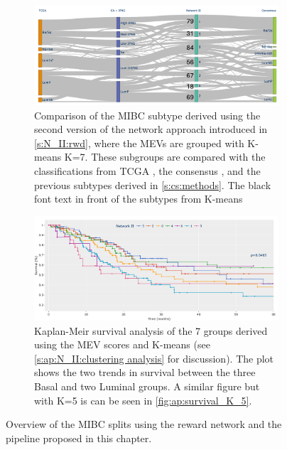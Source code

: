\begin{figure}[H]
    \centering
    \begin{subfigure}[!t]{1.0\textwidth}
        \includegraphics[width=1.0\textwidth,height=1.0\textheight,keepaspectratio]{Sections/Network_II/resources/reward/cluster_comp_final.png}
        \caption{Comparison of the MIBC subtype derived using the second version of the network approach introduced in \cref{s:N_II:rwd}, where the MEVs are grouped with K-means K=7. These subgroups are compared with the classifications from TCGA \citep{Robertson2017-mg}, the consensus \citep{Kamoun2020-tj}, and the previous subtypes derived in \cref{s:cs:methods}. The black font text in front of the subtypes from K-means }
        \label{fig:N_II:mibc_comp}
    \end{subfigure}
    \centering
    \begin{subfigure}[!t]{1.0\textwidth}
        \centering
        \includegraphics[width=1.0\textwidth,height=1.0\textheight,keepaspectratio]{Sections/Network_II/resources/reward/cluster_analysis/survival_K_7.png}
        \caption{Kaplan-Meir survival analysis of the 7 groups derived using the MEV scores and K-means (see \ref{s:ap:N_II:clustering analysis} for discussion). The plot shows the two trends in survival between the three Basal and two Luminal groups. A similar figure but with K=5 is can be seen in \cref{fig:ap:survival_K_5}. }
        \label{fig:N_II:survival_K_7}
    \end{subfigure} 
    \centering
    \caption{Overview of the MIBC splits using the reward network and the pipeline proposed in this chapter.}
\end{figure}

